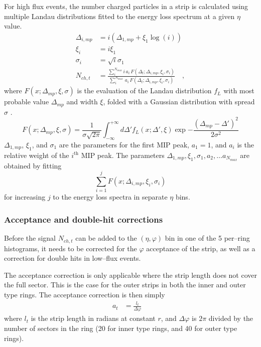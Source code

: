 \documentclass[11pt]{article}
\begin{document}
For high flux events, the number charged particles in a strip is
calculated using multiple Landau distributions fitted to the energy
loss spectrum at a given $\eta$ value.
\begin{align}
  \Delta_{i,mp} &= i (\Delta_{1,mp}+ \xi_1 \log(i))\nonumber\\
  \xi_i         &= i\xi_1\nonumber\\
  \sigma_i      &= \sqrt{i}\sigma_1\nonumber\\
  N_{ch,t} &= \frac{\sum_i^{N_{max}}
    i\,a_i\,F(\Delta_t;\Delta_{i,mp},\xi_i,\sigma_i)}{
    \sum_i^{N_{max}}\,a_i\,F(\Delta_t;\Delta_{i,mp},\xi_i,\sigma_i)}\quad,
\end{align}
where $F(x;\Delta_{mp},\xi,\sigma)$ is the evaluation of the Landau
distribution $f_L$ with most probable value $\Delta_{mp}$ and width
$\xi$, folded with a Gaussian distribution with spread $\sigma$
\cite{nim:b1:16,phyrev:a28:615}.
$$
F(x;\Delta_{mp},\xi,\sigma) = \frac{1}{\sigma \sqrt{2 \pi}}
\int_{-\infty}^{+\infty} d\Delta' f_{L}(x;\Delta',\xi)
\exp{-\frac{(\Delta_{mp}-\Delta')^2}{2\sigma^2}}
$$
$\Delta_{1,mp}$, $\xi_1$, and $\sigma_1$ are the parameters for the
first MIP peak, $a_1=1$, and $a_i$ is the relative weight of the
$i^{\text{th}}$ MIP peak.   The parameters $\Delta_{1,mp}, \xi_1,
\sigma_1, a_2, \ldots a_{N_{max}}$ are obtained by fitting 
$$
\sum_{i=1}^{j} F(x;\Delta_{i,mp},\xi_{i},\sigma_i) 
$$
for increasing $j$ to the energy loss spectra in separate $\eta$
bins. 

\subsubsection{Acceptance and double-hit corrections}

Before the signal $N_{ch,t}$ can be added to the $(\eta,\varphi)$
bin in one of the 5 per--ring histograms, it needs to be corrected for
the $\varphi$ acceptance of the strip, as well as a correction for
double hits in low--flux events.   

The acceptance correction is only applicable where the strip length
does not cover the full sector.  This is the case for the outer strips
in both the inner and outer type rings.  The acceptance correction is
then simply 
\begin{align}
  \label{eq:acc_corr}
  a_t &= \frac{l_t}{\Delta\varphi}\quad
\end{align}
where $l_t$ is the strip length in radians at constant $r$, and
$\Delta\varphi$ is $2\pi$ divided by the number of sectors in the
ring (20 for inner type rings, and 40 for outer type rings). 
\end{document}
